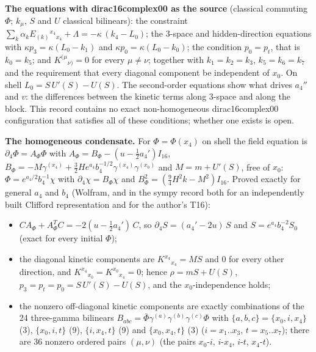\documentclass[11pt]{article}
\begin{document}
\textbf{The equations with dirac16complex00 as the source} (classical commuting $\Phi$; $k_\mu$, $S$ and $U$ classical bilinears): the constraint $\sum_k\alpha_k E_{(k)}{}^{x_4}{}_{x_4} + \Lambda = -\kappa\,(k_4 - L_0)$; the 3-space and hidden-direction equations with $\kappa p_3 = \kappa(L_0 - k_1)$ and $\kappa p_0 = \kappa(L_0 - k_0)$; the condition $p_0 = p_t$, that is $k_0 = k_5$; and $K^{(\mu}{}_{\nu)} = 0$ for every $\mu \ne \nu$; together with $k_1 = k_2 = k_3$, $k_5 = k_6 = k_7$ and the requirement that every diagonal component be independent of $x_0$. On shell $L_0 = S\,U'(S) - U(S)$. The second-order equations show what drives $a_4''$ and $v$: the differences between the kinetic terms along 3-space and along the block. This record contains no exact non-homogeneous dirac16complex00 configuration that satisfies all of these conditions; whether one exists is open.

\textbf{The homogeneous condensate.} For $\Phi = \Phi(x_4)$ on shell the field equation is $\partial_4\Phi = A_\Phi\Phi$ with $A_\Phi = B_\Phi - (u - \tfrac12a_4')I_{16}$, $B_\Phi = -M\gamma^{(x_4)} + \tfrac32He^{a_4}b_4^{-1/2}\gamma^{(x_4)}\gamma^{(x_0)}$ and $M = m + U'(S)$, free of $x_0$: $\Phi = e^{a_4/2}b_4^{-1}\chi$ with $\partial_4\chi = B_\Phi\chi$ and $B_\Phi^2 = (\tfrac94H^2k - M^2)I_{16}$. Proved exactly for general $a_4$ and $b_4$ (Wolfram, and in the sympy record both for an independently built Clifford representation and for the author's T16):

\begin{itemize}
\item $CA_\Phi + A_\Phi^TC = -2(u - \tfrac12a_4')\,C$, so $\partial_4S = (a_4' - 2u)\,S$ and $S = e^{a_4}b_4^{-2}S_0$ (exact for every initial $\Phi$);
\item the diagonal kinetic components are $K^{x_4}{}_{x_4} = MS$ and $0$ for every other direction, and $K^{x_4}{}_{x_0} = K^{x_0}{}_{x_4} = 0$; hence $\rho = mS + U(S)$, $p_3 = p_t = p_0 = S\,U'(S) - U(S)$, and the $x_0$-independence holds;
\item the nonzero off-diagonal kinetic components are exactly combinations of the 24 three-gamma bilinears $B_{abc} = \bar\Phi\gamma^{(a)}\gamma^{(b)}\gamma^{(c)}\Phi$ with $\{a,b,c\} = \{x_0, i, x_4\}$ (3), $\{x_0, i, t\}$ (9), $\{i, x_4, t\}$ (9) and $\{x_0, x_4, t\}$ (3) ($i = x_1..x_3$, $t = x_5..x_7$); there are 36 nonzero ordered pairs $(\mu, \nu)$ (the pairs $x_0$-$i$, $i$-$x_4$, $i$-$t$, $x_4$-$t$).
\end{itemize}
\end{document}

